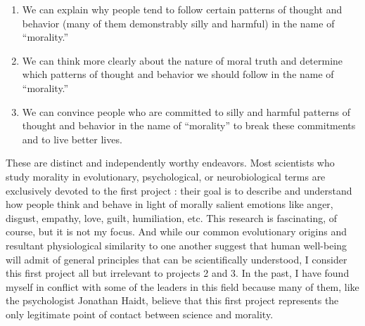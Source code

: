 \documentclass[a4paper,14pt]{extbook}
\begin{document}
\begin{enumerate}
      \item We can explain why people tend to follow certain patterns of thought and behavior (many of them demonstrably silly and harmful) in the name of ``morality.''
      \item We can think more clearly about the nature of moral truth and determine which patterns of thought and behavior we should follow in the name of ``morality.''
      \item We can convince people who are committed to silly and harmful patterns of thought and behavior in the name of ``morality'' to break these commitments and to live better lives.
\end{enumerate}

These are distinct and independently worthy endeavors.
Most scientists who study morality in evolutionary, psychological, or neurobiological terms are exclusively devoted to the first project :
their goal is to describe and understand how people think and behave in light of morally salient emotions like anger, disgust, empathy, love, guilt, humiliation, etc.
This research is fascinating, of course, but it is not my focus.
And while our common evolutionary origins and resultant physiological similarity to one another suggest that human well-being will admit of general principles that can be scientifically understood, I consider this first project all but irrelevant to projects 2 and 3.
In the past, I have found myself in conflict with some of the leaders in this field because many of them, like the psychologist Jonathan Haidt, believe that this first project represents the only legitimate point of contact between science and morality.
\end{document}
